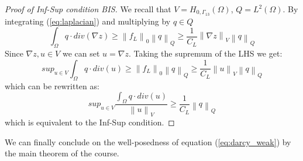 \documentclass[conference]{IEEEtran}
\newcommand{\norm}[1]{\left\lVert#1\right\rVert}
\begin{document}
\begin{proof}[Proof of Inf-Sup condition BIS]
\label{proof:InfSupBis}
We recall that $V=H_{0,\Gamma_{13}}(\Omega)$, $Q=L^2(\Omega)$. By integrating (\ref{eq:laplacian}) and multiplying by $q\in Q$ 
\begin{equation}
	\int_{\Omega} q \cdot div(\nabla z) \geq \norm{f_L}_0 \norm{q}_Q \geq
	\frac{1}{C_L} \norm{\nabla z}_V \norm{q}_Q
\end{equation}
Since $\nabla z, u \in V$ we can set $u = \nabla z$. Taking the supremum of the LHS we get:
\begin{equation}
	sup_{u\in V} \int_{\Omega} q \cdot div(u) \geq \norm{f_L}_0 \norm{q}_Q \geq 
	\frac{1}{C_L} \norm{u}_V \norm{q}_Q
\end{equation}
which can be rewritten as:
\begin{equation}
	sup_{u\in V} \frac{ \int_{\Omega} q \cdot div(u)}{\norm{u}_V} \geq \frac{1}{C_L} \norm{q}_Q
\end{equation}
which is equivalent to the Inf-Sup condition.
\end{proof}

We can finally conclude on the well-posedness of equation (\ref{eq:darcy_weak}) by the main theorem of the course.




\end{document}
